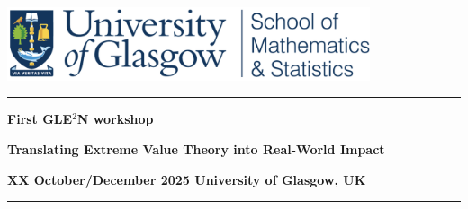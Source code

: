 \documentclass[
  11pt,
  letterpaper,
  DIV=11,
  numbers=noendperiod]{scrartcl}
\author{}
\date{}
\begin{document}
\begin{titlepage}
\centering

\includegraphics[width=0.8\textwidth]{UofGMS_header.png}

\vspace*{4cm}

\noindent\rule{\textwidth}{1pt}
{\Large \bfseries First GLE$^2$N workshop \par}

{\Huge \bfseries Translating Extreme Value Theory into Real-World Impact  \par}

{\large \bfseries XX October/December 2025 University of Glasgow, UK\par}

\noindent\rule{\textwidth}{1pt}
\vspace{1.5cm}






\end{titlepage}
\clearpage
\setcounter{page}{1}
\end{document}

